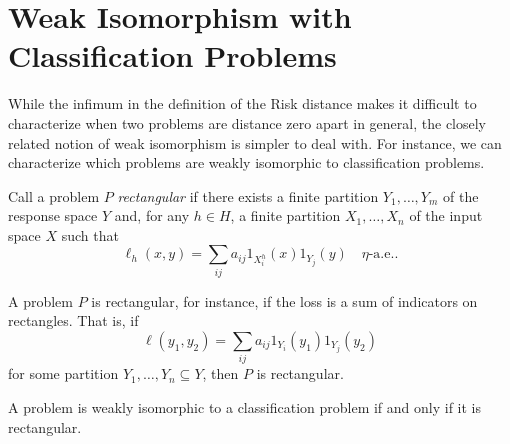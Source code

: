 \documentclass[twoside,11pt]{article}
\begin{document}
\section{Weak Isomorphism with Classification Problems}\label{appendix:weak-iso}
    While the infimum in the definition of the Risk distance makes it difficult to characterize when two problems are distance zero apart in general, the closely related notion of weak isomorphism is simpler to deal with. For instance, we can characterize which problems are weakly isomorphic to classification problems.
\begin{definition}
    Call a problem $P$ \textit{rectangular} if there exists a finite partition $Y_1,\dots,Y_m$ of the response space $Y$ and, for any $h\in H$, a finite partition $X_1,\dots,X_n$ of the input space $X$ such that
    \[\ell_h(x,y) = \sum_{ij}a_{ij}1_{X_i^h}(x) 1_{Y_j}(y)\quad \eta{\text{-a.e.}}.\]
\end{definition}
A problem $P$ is rectangular, for instance, if the loss is a sum of indicators on rectangles. That is, if
\[\ell(y_1,y_2) = \sum_{ij} a_{ij} 1_{Y_i}(y_1) 1_{Y_j}(y_2)\]
for some partition $Y_1,\dots, Y_n \subseteq Y$, then $P$ is rectangular.
\begin{theorem}
    A problem is weakly isomorphic to a classification problem if and only if it is rectangular. 
\end{theorem}
\end{document}
